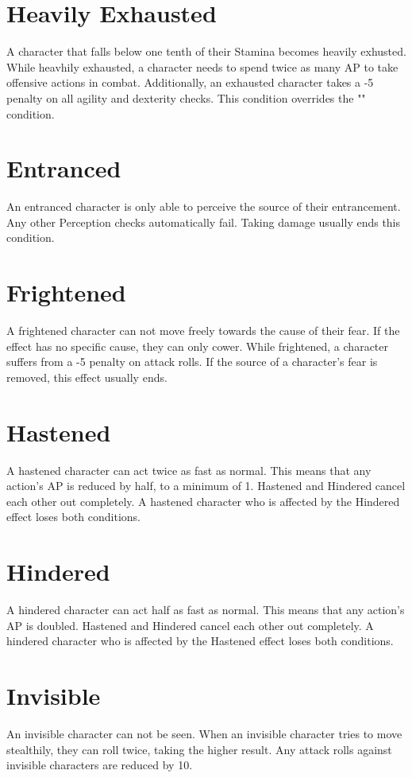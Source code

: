 \section{Heavily Exhausted}\label{condition:heavilyExhausted}
A character that falls below one tenth of their Stamina becomes heavily exhusted.
While heavhily exhausted, a character needs to spend twice as many AP to take offensive actions in combat.
Additionally, an exhausted character takes a -5 penalty on all agility and dexterity checks.
This condition overrides the "" condition.

\section{Entranced}\label{condition:entranced}
An entranced character is only able to perceive the source of their entrancement.
Any other Perception checks automatically fail.
Taking damage usually ends this condition.

\section{Frightened}\label{condition:frightened}
A frightened character can not move freely towards the cause of their fear.
If the effect has no specific cause, they can only cower.
While frightened, a character suffers from a -5 penalty on attack rolls.
If the source of a character's fear is removed, this effect usually ends.

\section{Hastened}\label{condition:hastened}
A hastened character can act twice as fast as normal.
This means that any action's AP is reduced by half, to a minimum of 1.
Hastened and Hindered cancel each other out completely.
A hastened character who is affected by the Hindered effect loses both conditions.

\section{Hindered}\label{condition:hindered}
A hindered character can act half as fast as normal.
This means that any action's AP is doubled.
Hastened and Hindered cancel each other out completely.
A hindered character who is affected by the Hastened effect loses both conditions.

\section{Invisible}\label{condition:invisible}
An invisible character can not be seen.
When an invisible character tries to move stealthily, they can roll twice, taking the higher result.
Any attack rolls against invisible characters are reduced by 10.


